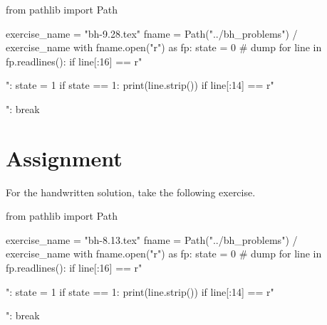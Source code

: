 \begin{pycode}
from pathlib import Path

exercise_name = "bh-9.28.tex"
fname = Path("../bh_problems") / exercise_name
with fname.open("r") as fp:
    state = 0  # dump
    for line in fp.readlines():
        if line[:16] == r"\begin{exercise}":
            state = 1
        if state == 1:
            print(line.strip())
        if line[:14] == r"\end{exercise}":
            break
\end{pycode}







\section{Assignment}
\label{sec:assignment}

For the handwritten solution, take the following exercise.

\begin{pycode}
from pathlib import Path

exercise_name = "bh-8.13.tex"
fname = Path("../bh_problems") / exercise_name
with fname.open("r") as fp:
    state = 0  # dump
    for line in fp.readlines():
        if line[:16] == r"\begin{exercise}":
            state = 1
        if state == 1:
            print(line.strip())
        if line[:14] == r"\end{exercise}":
            break
\end{pycode}








